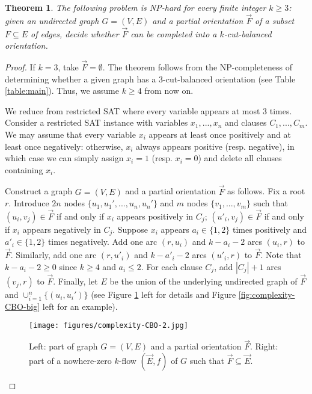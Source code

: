 \documentclass[11pt]{article}
\newtheorem{theorem}{Theorem}
\begin{document}
\begin{theorem}\label{thm:complete-CBO-hard}
The following problem is NP-hard for every finite integer $k\ge 3$: given an undirected graph $G=(V, E)$ and a partial orientation $\vec{F}$ of a subset $F\subseteq E$ of edges, decide whether $\vec{F}$ can be completed into a $k$-cut-balanced orientation.
\end{theorem}
\begin{proof}
    If $k=3$, take $\vec{F}=\emptyset$. The theorem follows from the NP-completeness of determining whether a given graph has a $3$-cut-balanced orientation (see Table \ref{table:main}). 
Thus, we assume $k\geq 4$ from now on.
    
    We reduce from restricted SAT where every variable appears at most $3$ times. Consider a restricted SAT instance with variables $x_1,...,x_n$ and clauses $C_1,...,C_m$. We may assume that every variable $x_i$ appears at least once positively and at least once negatively: otherwise, $x_i$ always appears positive (resp. negative), in which case we can simply assign $x_i=1$ (resp. $x_i=0$) and delete all clauses containing $x_i$. 
    
    Construct a graph $G=(V,E)$ and a partial orientation $\vec{F}$ as follows. Fix a root $r$. Introduce $2n$ nodes $\{u_1,u_1',...,u_n,u_n'\}$ and $m$ nodes $\{v_1,...,v_m\}$ such that $(u_i,v_j)\in \vec{F}$ if and only if $x_i$ appears positively in $C_j$; $(u'_i,v_j)\in \vec{F}$ if and only if $x_i$ appears negatively in $C_j$. Suppose $x_i$ appears $a_i\in\{1,2\}$ times positively and $a'_i\in\{1,2\}$ times negatively. Add one arc $(r,u_i)$ and $k-a_i-2$ arcs $(u_i,r)$ to $\vec{F}$. Similarly, add one arc $(r,u'_i)$ and $k-a'_i-2$ arcs $(u'_i,r)$ to $\vec{F}$. Note that $k-a_i-2\geq 0$ since $k\geq 4$ and $a_i\leq 2$. For each clause $C_j$, add $|C_j|+1$ arcs $(v_j,r)$ to $\vec{F}$. Finally, let $E$ be the union of the underlying undirected graph of $\vec{F}$ and $\cup_{i=1}^n\{(u_i,u_i')\}$ (see Figure \ref{fig:complexity-CBO-small} left for details and Figure \ref{fig:complexity-CBO-big} left for an example).
\begin{figure}[htbp]
    \centering
    \texttt{[image: figures/complexity-CBO-2.jpg]}
    \caption{Left: part of graph $G=(V,E)$ and a partial orientation $\vec{F}$. Right: part of a nowhere-zero $k$-flow $(\vec{E},f)$ of $G$ such that $\vec{F}\subseteq \vec{E}$.}
    \label{fig:complexity-CBO-small}
\end{figure}


\end{proof}
\end{document}
